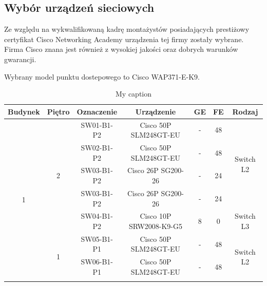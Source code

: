 \documentclass{article}
\begin{document}
\subsection{Wybór urządzeń sieciowych}
\par Ze względu na wykwalifikowaną kadrę montażystów posiadających prestiżowy certyfikat Cisco Networking Academy urządzenia tej firmy zostały wybrane. Firma Cisco znana jest również z wysokiej jakości oraz dobrych warunków gwarancji.
\par Wybrany model punktu dostepowego to Cisco WAP371-E-K9.
\begin{table}[H]
	\centering
	\caption{My caption}
	\begin{tabular}{|c|c|c|c|c|c|c|}
		\hline
		\textbf{Budynek}    & \textbf{Piętro}    & \textbf{Oznaczenie}             & \textbf{Urządzenie}                        & \textbf{GE}            & \textbf{FE}             & \textbf{Rodzaj}            \\ \hline
		\multirow{8}{*}{1}  & \multirow{5}{*}{2} & SW01-B1-P2                      & Cisco 50P SLM248GT-EU                      & -                      & 48                      & \multirow{4}{*}{Switch L2} \\ \cline{3-6}
		&                    & SW02-B1-P2                      & Cisco 50P SLM248GT-EU                      & -                      & 48                      &                            \\ \cline{3-6}
		&                    & SW03-B1-P2                      & Cisco 26P SG200-26                     	& -                      & 24                      &                            \\ \cline{3-6}
		&                    & SW03-B1-P2                      & Cisco 26P SG200-26                      	& -                      & 24                      &                            \\ \cline{3-7} 
		&                    & SW04-B1-P2                      & Cisco 10P SRW2008-K9-G5                    & 8                      & 0                       & Switch L3                  \\ \cline{2-7} 
		& \multirow{3}{*}{1} & SW05-B1-P1                      & Cisco 50P SLM248GT-EU                      & -                      & 48                      & \multirow{3}{*}{Switch L2} \\ \cline{3-6}
		&                    & SW06-B1-P1                      & Cisco 50P SLM248GT-EU                      & -                      & 48                      &                            \\ \cline{3-6}

\end{tabular}
\end{table}
\end{document}
